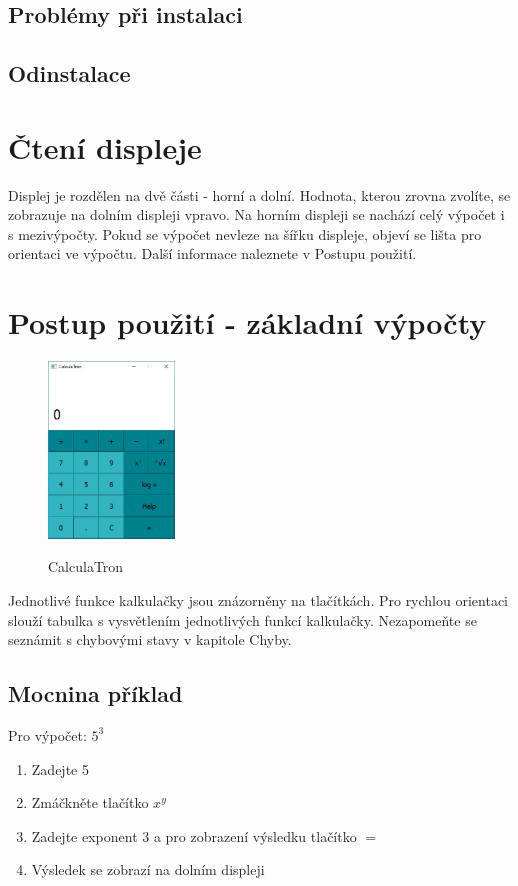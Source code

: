 \documentclass[11pt,a4paper]{article}
\begin{document}
\subsection{Problémy při instalaci}

\subsection{Odinstalace}

\section{Čtení displeje}
Displej je rozdělen na dvě části - horní a dolní. Hodnota, kterou zrovna zvolíte, se zobrazuje na dolním displeji vpravo. Na horním displeji se nachází celý výpočet i s mezivýpočty. Pokud se výpočet nevleze na šířku displeje, objeví se lišta pro orientaci ve výpočtu. Další informace naleznete v Postupu použití. 

\section{Postup použití - základní výpočty}

\begin{figure}[h]
\begin{center}
    \includegraphics[width=0.3\textwidth,natwidth=610,natheight=642]{calc.png}
    \label{pic:bitmap}
    \caption{CalculaTron}
\end{center}
\end{figure}

Jednotlivé funkce kalkulačky jsou znázorněny na tlačítkách. Pro rychlou orientaci slouží tabulka s vysvětlením jednotlivých funkcí kalkulačky. Nezapomeňte se seznámit s chybovými stavy v kapitole Chyby.

\subsection{Mocnina příklad}
Pro výpočet: $5^3$ 
\begin{enumerate}
\item Zadejte 5
\item Zmáčkněte tlačítko $x^y$
\item Zadejte exponent 3 a pro zobrazení výsledku tlačítko $=$
\item Výsledek se zobrazí na dolním displeji
\end{enumerate}
\end{document}
